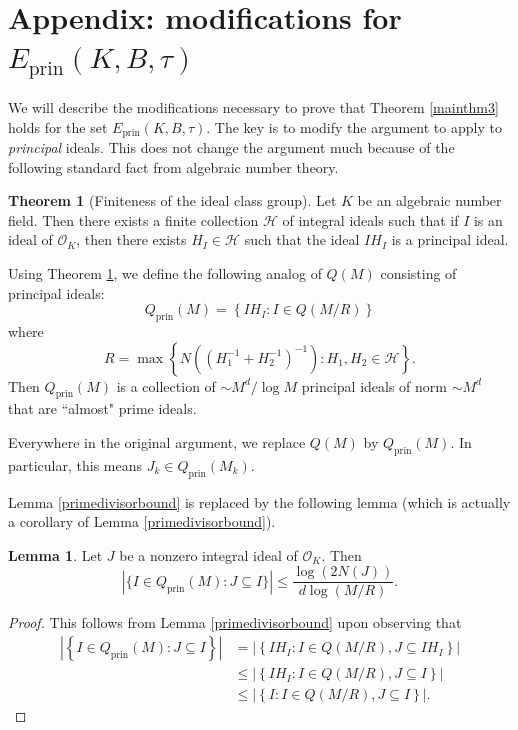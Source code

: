 \documentclass{amsart}
\numberwithin{equation}{section}
\theoremstyle{definition}
\newtheorem{thm}[theorem]{Theorem}
\newtheorem{lemma}[theorem]{Lemma}
\theoremstyle{definition}
\newcommand{\cbr}[1]{ \left\{ {#1} \right\} }
\newcommand{\OK}{\mathcal{O}_K}
\newcommand{\prin}{\mathrm{prin}}
\begin{document}
\section{Appendix: modifications for \texorpdfstring{$E_{\prin}(K,B,\tau)$}{Eprin(K,B,tau)}}\label{sec_prin}
We will describe the modifications necessary to prove that Theorem \ref{mainthm3} holds for the set $E_{\prin}(K,B,\tau)$. The key 
is to modify the argument to apply to \textit{principal} ideals. This does not change the argument much because of the following standard fact from algebraic number theory.
\begin{thm}[Finiteness of the ideal class group]\label{idealclassthm}
Let $K$ be an algebraic number field. Then there exists a finite collection $\mathcal{H}$ of integral ideals such that if $I$ is an ideal of $\OK$, then there exists $H_I \in \mathcal{H}$ such that the ideal $I H_I$ is a principal ideal.
\end{thm}

Using Theorem \ref{idealclassthm}, we define the following analog of $Q(M)$ consisting of principal ideals: 
\[Q_{\prin}(M) = \left\{I H_I : I \in Q(M/R) \right\}\]
where 
$$
R = \max\cbr{ N((H_{1}^{-1} + H_{2}^{-1})^{-1}) : H_1, H_2 \in \mathcal{H} }. 
$$
%
%
Then $Q_{\prin}(M)$ is a collection of $\sim {M^d}/{\log M}$ principal ideals of norm $\sim M^d$ that are ``almost" prime ideals. 

Everywhere in the original argument, we replace $Q(M)$ by $Q_{\prin}(M)$.   
In particular, this means $J_k \in Q_{\prin}(M_k)$. 

Lemma \ref{primedivisorbound} is replaced by the following lemma (which is actually a corollary of Lemma \ref{primedivisorbound}). 

\begin{lemma}\label{principaldivisorbound}
Let $J$ be a nonzero integral ideal of $\OK$. Then 
\begin{equation}\label{principaldivisorineq}
|\{I \in Q_{\prin}(M) : J \subseteq I \}| \leq \frac{\log (2N(J))}{d \log (M/R)}.
\end{equation}
\end{lemma}
\begin{proof}
This follows from Lemma \ref{primedivisorbound} upon observing that 
\begin{align*}
|\cbr{I \in Q_{\text{prin}}(M) : J \subseteq I    }|
&=
|\cbr{I H_I : I \in Q(M/R), J \subseteq I H_I}| 
\\
&\leq 
|\cbr{I H_I : I \in Q(M/R), J \subseteq I}| 
\\
&\leq 
|\cbr{I : I \in Q(M/R), J \subseteq I}|.
\end{align*}
\end{proof}
\end{document}
